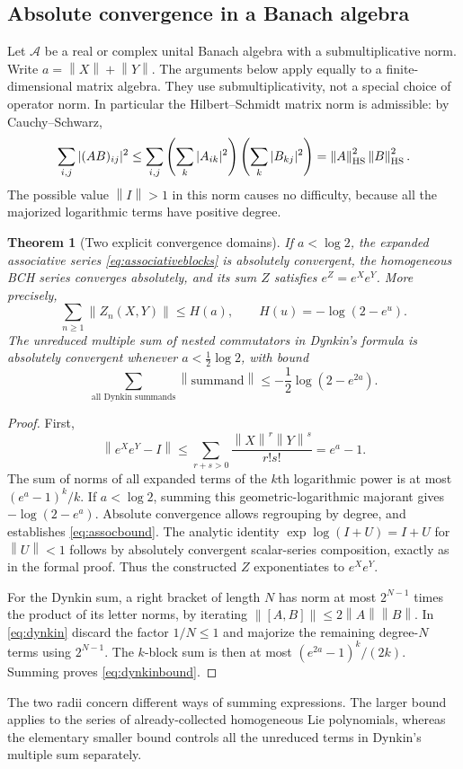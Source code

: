 \documentclass[11pt]{article}
\numberwithin{equation}{section}
\newtheorem{theorem}{Theorem}[section]
\theoremstyle{definition}
\theoremstyle{remark}
\newcommand{\cA}{\mathcal{A}}
\newcommand{\norm}[1]{\left\lVert#1\right\rVert}
\begin{document}
\subsection{Absolute convergence in a Banach algebra}
Let $\cA$ be a real or complex unital Banach algebra with a
submultiplicative norm. Write $a=\norm{X}+\norm{Y}$. The arguments
below apply equally to a finite-dimensional matrix algebra. They use
submultiplicativity, not a special choice of operator norm. In
particular the Hilbert--Schmidt matrix norm is admissible: by
Cauchy--Schwarz,
\[
 \sum_{i,j}|(AB)_{ij}|^2
 \leq\sum_{i,j}\left(\sum_k|A_{ik}|^2\right)
                    \left(\sum_k|B_{kj}|^2\right)
 =\norm{A}_{\rm HS}^2\norm{B}_{\rm HS}^2.
\]
The possible value $\norm{I}>1$ in this norm causes no difficulty,
because all the majorized logarithmic terms have positive degree.

\begin{theorem}[Two explicit convergence domains]\label{thm:convergence}
If $a<\log2$, the expanded associative series
\eqref{eq:associativeblocks} is absolutely convergent, the homogeneous
BCH series converges absolutely, and its sum $Z$ satisfies
$e^Z=e^Xe^Y$. More precisely,
\begin{equation}\label{eq:assocbound}
 \sum_{n\geq1}\norm{Z_n(X,Y)}\leq H(a),
 \qquad H(u)=-\log(2-e^u).
\end{equation}
The unreduced multiple sum of nested commutators in Dynkin's formula
is absolutely convergent whenever $a<\frac12\log2$, with bound
\begin{equation}\label{eq:dynkinbound}
 \sum_{\text{all Dynkin summands}}\norm{\text{summand}}
 \leq -\frac12\log(2-e^{2a}).
\end{equation}
\end{theorem}
\begin{proof}
First,
\[
 \norm{e^Xe^Y-I}\leq
 \sum_{r+s>0}\frac{\norm{X}^r\norm{Y}^s}{r!s!}
 =e^a-1.
\]
The sum of norms of all expanded terms of the $k$th logarithmic power
is at most $(e^a-1)^k/k$. If $a<\log2$, summing this geometric-logarithmic
majorant gives $-\log(2-e^a)$. Absolute convergence allows regrouping
by degree, and establishes \eqref{eq:assocbound}. The analytic
identity $\exp\log(I+U)=I+U$ for $\norm{U}<1$ follows by absolutely
convergent scalar-series composition, exactly as in the formal proof.
Thus the constructed $Z$ exponentiates to $e^Xe^Y$.

For the Dynkin sum, a right bracket of length $N$ has norm at most
$2^{N-1}$ times the product of its letter norms, by iterating
$\norm{[A,B]}\leq2\norm{A}\norm{B}$. In \eqref{eq:dynkin} discard
the factor $1/N\leq1$ and majorize the remaining degree-$N$ terms
using $2^{N-1}$. The $k$-block sum is then at most
$(e^{2a}-1)^k/(2k)$. Summing proves \eqref{eq:dynkinbound}.
\end{proof}
The two radii concern different ways of summing expressions. The
larger bound applies to the series of already-collected homogeneous
Lie polynomials, whereas the elementary smaller bound controls all
the unreduced terms in Dynkin's multiple sum separately.
\end{document}

